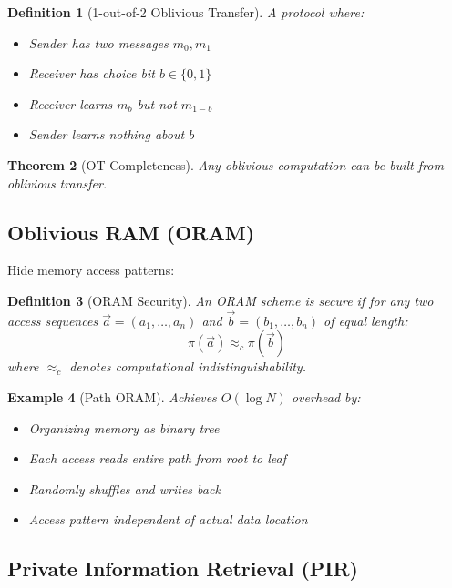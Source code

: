 \documentclass[11pt,final,hidelinks]{article}
\newtheorem{theorem}{Theorem}[section]
\newtheorem{definition}[theorem]{Definition}
\newtheorem{example}[theorem]{Example}
\newcommand{\Pattern}[1]{\pi(#1)}
\begin{document}
\begin{definition}[1-out-of-2 Oblivious Transfer]
A protocol where:
\begin{itemize}
    \item Sender has two messages $m_0, m_1$
    \item Receiver has choice bit $b \in \{0,1\}$
    \item Receiver learns $m_b$ but not $m_{1-b}$
    \item Sender learns nothing about $b$
\end{itemize}
\end{definition}

\begin{theorem}[OT Completeness]
Any oblivious computation can be built from oblivious transfer.
\end{theorem}

\subsection{Oblivious RAM (ORAM)}

Hide memory access patterns:

\begin{definition}[ORAM Security]
An ORAM scheme is secure if for any two access sequences $\vec{a} = (a_1, \ldots, a_n)$ and $\vec{b} = (b_1, \ldots, b_n)$ of equal length:
\begin{equation}
\Pattern{\vec{a}} \approx_c \Pattern{\vec{b}}
\end{equation}
where $\approx_c$ denotes computational indistinguishability.
\end{definition}

\begin{example}[Path ORAM]
Achieves $O(\log N)$ overhead by:
\begin{itemize}
    \item Organizing memory as binary tree
    \item Each access reads entire path from root to leaf
    \item Randomly shuffles and writes back
    \item Access pattern independent of actual data location
\end{itemize}
\end{example}

\subsection{Private Information Retrieval (PIR)}
\end{document}
